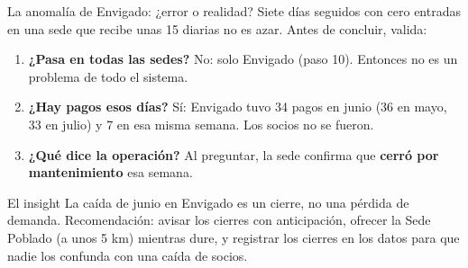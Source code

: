 \documentclass[aspectratio=169,11pt]{beamer}
\begin{document}
\begin{frame}[t]{La anomalía de Envigado: ¿error o realidad?}
  \small
  Siete días seguidos con cero entradas en una sede que recibe unas 15
  diarias no es azar. Antes de concluir, valida:
  \vspace{0.1cm}
  \begin{enumerate}
    \small
    \item \textbf{¿Pasa en todas las sedes?} No: solo Envigado (paso 10).
      Entonces no es un problema de todo el sistema.
    \item \textbf{¿Hay pagos esos días?} Sí: Envigado tuvo 34 pagos en
      junio (36 en mayo, 33 en julio) y 7 en esa misma semana. Los socios no
      se fueron.
    \item \textbf{¿Qué dice la operación?} Al preguntar, la sede confirma
      que \textbf{cerró por mantenimiento} esa semana.
  \end{enumerate}
  \vspace{0.1cm}
  \begin{exampleblock}{El insight}
    \small La caída de junio en Envigado es un cierre, no una pérdida de
    demanda. Recomendación: avisar los cierres con anticipación, ofrecer
    la Sede Poblado (a unos 5 km) mientras dure, y registrar los cierres
    en los datos para que nadie los confunda con una caída de socios.
  \end{exampleblock}
\end{frame}
\end{document}
